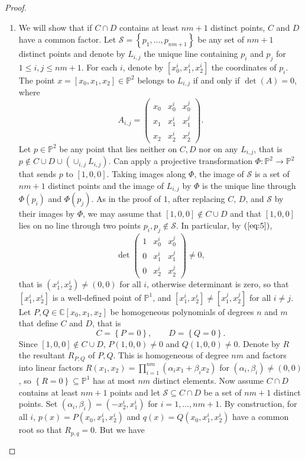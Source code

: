 \documentclass{article}
\newcommand{\C}{\mathbb{C}}
\renewcommand{\P}{\mathbb{P}}
\newcommand{\rb}[1]{\left( #1 \right)}
\renewcommand{\sb}[1]{\left[ #1 \right]}
\newcommand{\cb}[1]{\left\{ #1 \right\}}
\theoremstyle{definition}\newtheorem{definition}{Definition}[section]
\theoremstyle{definition}\newtheorem{notation}[definition]{Notation}
\theoremstyle{definition}\newtheorem{remark}[definition]{Remark}
\theoremstyle{definition}\newtheorem{example}[definition]{Example}
\theoremstyle{definition}\newtheorem{fact}{Fact}
\theoremstyle{definition}\newtheorem{exercise}{Exercise}
\begin{document}
\begin{proof}
\begin{enumerate}

\item We will show that if $ C \cap D $ contains at least $ nm + 1 $ distinct points, $ C $ and $ D $ have a common factor. Let $ \mathcal{S} = \cb{p_1, \dots, p_{nm + 1}} $ be any set of $ nm + 1 $ distinct points and denote by $ L_{i, j} $ the unique line containing $ p_i $ and $ p_j $ for $ 1 \le i, j \le nm + 1 $. For each $ i $, denote by $ \sb{x_0^i, x_1^i, x_2^i} $ the coordinates of $ p_i $. The point $ x = \sb{x_0, x_1, x_2} \in \P^2 $ belongs to $ L_{i, j} $ if and only if $ \det\rb{A} = 0 $, where
\begin{equation}
\label{eq:5}
A_{i, j} = \begin{pmatrix} x_0 & x_0^i & x_0^j \\ x_1 & x_1^i & x_1^j \\ x_2 & x_2^i & x_2^j \end{pmatrix}.
\end{equation}
Let $ p \in \P^2 $ be any point that lies neither on $ C, D $ nor on any $ L_{i, j} $, that is $ p \notin C \cup D \cup \rb{\cup_{i, j} L_{i, j}} $. Can apply a projective transformation $ \Phi : \P^2 \to \P^2 $ that sends $ p $ to $ \sb{1, 0, 0} $. Taking images along $ \Phi $, the image of $ \mathcal{S} $ is a set of $ nm + 1 $ distinct points and the image of $ L_{i, j} $ by $ \Phi $ is the unique line through $ \Phi\rb{p_i} $ and $ \Phi\rb{p_j} $. As in the proof of $ 1 $, after replacing $ C $, $ D $, and $ \mathcal{S} $ by their images by $ \Phi $, we may assume that $ \sb{1, 0, 0} \notin C \cup D $ and that $ \sb{1, 0, 0} $ lies on no line through two points $ p_i, p_j \notin \mathcal{S} $. In particular, by $ \rb{\ref{eq:5}} $,
$$ \det\begin{pmatrix} 1 & x_0^i & x_0^j \\ 0 & x_1^i & x_1^j \\ 0 & x_2^i & x_2^j \end{pmatrix} \ne 0, $$
that is $ \rb{x_1^i, x_2^i} \ne \rb{0, 0} $ for all $ i $, otherwise determinant is zero, so that $ \sb{x_1^i, x_2^i} $ is a well-defined point of $ \P^1 $, and $ \sb{x_1^i, x_2^i} \ne \sb{x_1^j, x_2^j} $ for all $ i \ne j $. Let $ P, Q \in \C\sb{x_0, x_1, x_2} $ be homogeneous polynomials of degrees $ n $ and $ m $ that define $ C $ and $ D $, that is
$$ C = \cb{P = 0}, \qquad D = \cb{Q = 0}. $$
Since $ \sb{1, 0, 0} \notin C \cup D $, $ P\rb{1, 0, 0} \ne 0 $ and $ Q\rb{1, 0 , 0} \ne 0 $. Denote by $ R $ the resultant $ R_{P, Q} $ of $ P, Q $. This is homogeneous of degree $ nm $ and factors into linear factors $ R\rb{x_1, x_2} = \prod_{i = 1}^{nm}\rb{\alpha_ix_1 + \beta_ix_2} $ for $ \rb{\alpha_i, \beta_i} \ne \rb{0, 0} $, so $ \cb{R = 0} \subseteq \P^1 $ has at most $ nm $ distinct elements. Now assume $ C \cap D $ contains at least $ nm + 1 $ points and let $ \mathcal{S} \subseteq C \cap D $ be a set of $ nm + 1 $ distinct points. Set $ \rb{\alpha_i, \beta_i} = \rb{-x_2^i, x_1^i} $ for $ i = 1, \dots, nm + 1 $. By construction, for all $ i $, $ p\rb{x} = P\rb{x_0, x_1^i, x_2^i} $ and $ q\rb{x} = Q\rb{x_0, x_1^i, x_2^i} $ have a common root so that $ R_{p, q} = 0 $. But we have

\end{enumerate}
\end{proof}
\end{document}
